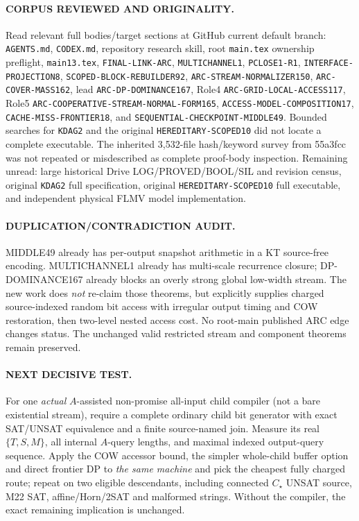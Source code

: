 \documentclass[11pt]{article}
\begin{document}
\paragraph{CORPUS REVIEWED AND ORIGINALITY.}
Read relevant full bodies/target sections at GitHub current default
branch: \texttt{AGENTS.md}, \texttt{CODEX.md}, repository research skill,
root \texttt{main.tex} ownership preflight, \texttt{main13.tex},
\texttt{FINAL-LINK-ARC}, \texttt{MULTICHANNEL1}, \texttt{PCLOSE1-R1},
\texttt{INTERFACE-PROJECTION8}, \texttt{SCOPED-BLOCK-REBUILDER92},
\texttt{ARC-STREAM-NORMALIZER150}, \texttt{ARC-COVER-MASS162},
lead \texttt{ARC-DP-DOMINANCE167}, Role4
\texttt{ARC-GRID-LOCAL-ACCESS117}, Role5
\texttt{ARC-COOPERATIVE-STREAM-NORMAL-FORM165},
\texttt{ACCESS-MODEL-COMPOSITION17},
\texttt{CACHE-MISS-FRONTIER18}, and
\texttt{SEQUENTIAL-CHECKPOINT-MIDDLE49}.
Bounded searches for \texttt{KDAG2} and the original
\texttt{HEREDITARY-SCOPED10} did not locate a complete executable.
The inherited 3,532-file hash/keyword survey from 55a3fcc was not
repeated or misdescribed as complete proof-body inspection.
Remaining unread: large historical Drive LOG/PROVED/BOOL/SIL and
revision census, original \texttt{KDAG2} full specification, original
\texttt{HEREDITARY-SCOPED10} full executable, and independent
physical FLMV model implementation.

\paragraph{DUPLICATION/CONTRADICTION AUDIT.}
MIDDLE49 already has per-output snapshot arithmetic in a KT
source-free encoding. MULTICHANNEL1 already has multi-scale
recurrence closure; DP-DOMINANCE167 already blocks an overly strong
global low-width stream. The new work does \emph{not} re-claim those
theorems, but explicitly supplies charged source-indexed random bit
access with irregular output timing and COW restoration, then
two-level nested access cost. No root-main published ARC edge
changes status. The unchanged valid restricted stream and
component theorems remain preserved.

\paragraph{NEXT DECISIVE TEST.}
For one \emph{actual} $A$-assisted non-promise all-input child compiler
(not a bare existential stream), require a complete ordinary child
bit generator with exact SAT/UNSAT equivalence and a finite
source-named join. Measure its real $\{T,S,M\}$,
all internal $A$-query lengths, and maximal indexed output-query
sequence. Apply the COW accessor bound, the simpler whole-child
buffer option and direct frontier DP to \emph{the same machine}
and pick the cheapest fully charged route; repeat on two eligible
descendants, including connected $C_\star$ UNSAT source, M22 SAT,
affine/Horn/2SAT and malformed strings. Without the compiler,
the exact remaining implication is unchanged.
\end{document}
